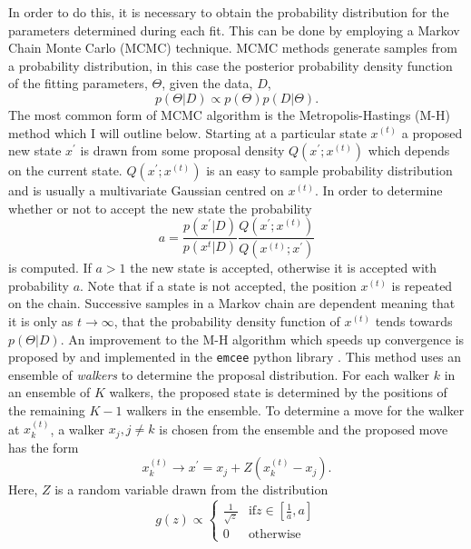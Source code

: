In order to do this, it is necessary to obtain the probability distribution for the parameters determined during each fit. This can be done by employing a Markov Chain Monte Carlo (MCMC) technique. MCMC methods generate samples from a probability distribution, in this case the posterior probability density function of the fitting parameters, $\Theta$, given the data, $D$,
\begin{equation}
\label{eq:pdf}
p(\Theta \vert D) \propto p(\Theta)p(D \vert \Theta).
\end{equation}	
The most common form of MCMC algorithm is the Metropolis-Hastings (M-H) method which I will outline below. Starting at a particular state $x^{(t)}$ a proposed new state $x^\prime$ is drawn from some proposal density $Q(x^\prime;x^{(t)})$ which depends on the current state. $Q(x^\prime;x^{(t)})$ is an easy to sample probability distribution and is usually a multivariate Gaussian centred on $x^{(t)}$. In order to determine whether or not to accept the new state the probability
\begin{equation}
\label{eq:MHnewstate}
a = \frac{p(x^\prime \vert D)}{p(x^{t} \vert D)} \frac{Q(x^\prime;x^{(t)})}{Q(x^{(t)};x^\prime)}
\end{equation}
is computed. If $a > 1$ the new state is accepted, otherwise it is accepted with probability $a$. Note that if a state is not accepted, the position $x^{(t)}$ is repeated on the chain. Successive samples in a Markov chain are dependent meaning that it is only as $t \rightarrow \infty$, that the probability density function of $x^{(t)}$ tends towards $p(\Theta \vert D)$. An improvement to the M-H algorithm which speeds up convergence is proposed by \cite{Goodman2010} and implemented in the \texttt{emcee} python library \citep{Foreman-Mackey2012}. This method uses an ensemble of \textit{walkers} to determine the proposal distribution. For each walker $k$ in an ensemble of $K$ walkers, the proposed state is determined by the positions of the remaining $K-1$ walkers in the ensemble. To determine a move for the walker at $x_k^{(t)}$, a walker $x_j, j \neq k$ is chosen from the ensemble and the proposed move has the form
\begin{equation}
\label{eq:MCMC_walkers}
x_k^{(t)} \rightarrow x^\prime = x_j + Z(x_k^{(t)} - x_j).
\end{equation}
Here, $Z$ is a random variable drawn from the distribution
\begin{equation}
\label{eq:MCMC_g}
g(z) \propto 
\begin{cases}
\frac{1}{\sqrt{z}} & \mbox{if} z \in \left[\frac{1}{a}, a \right] \\
0 & \mbox{otherwise}
\end{cases}
\end{equation}
